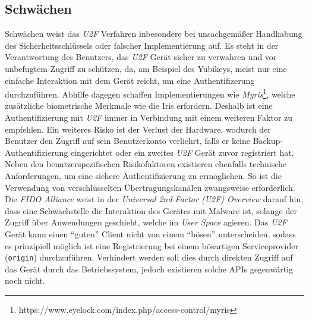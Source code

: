 \documentclass[11pt,a4paper,ngerman]{scrreprt}
\begin{document}
\subsection{Schwächen}
Schwächen weist das \textit{U2F} Verfahren inbesondere bei unsachgemäßer Handhabung des Sicherheitsschlüssels oder falscher Implementierung auf. Es steht in der Verantwortung des Benutzers, das \textit{U2F} Gerät sicher zu verwahren und vor unbefugtem Zugriff zu schützen, da, am Beispiel des Yubikeys, meist nur eine einfache Interaktion mit dem Gerät reicht, um eine Authentifizerung durchzuführen. Abhilfe dagegen schaffen Implementierungen wie \textit{Myris}\footnote{https://www.eyelock.com/index.php/access-control/myris}, welche zusätzliche biometrische Merkmale wie die Iris erfordern. Deshalb ist eine Authentifizierung mit \textit{U2F} immer in Verbindung mit einem weiteren Faktor zu empfehlen. Ein weiteres Risko ist der Verlust der Hardware, wodurch der Benutzer den Zugriff auf sein Benutzerkonto verliehrt, falls er keine Backup-Authentifizierung eingerichtet oder ein zweites \textit{U2F} Gerät zuvor registriert hat. Neben den benutzerspezifischen Risikofaktoren existieren ebenfalls technische Anforderungen, um eine sichere Authentifizierung zu ermöglichen. So ist die Verwendung von verschlüsselten Übertragungskanälen zwangsweise erforderlich. Die \textit{FIDO Alliance} weist in der \textit{Universal 2nd Factor (U2F) Overview} \cite{u2fSpec} darauf hin, dass eine Schwachstelle die Interaktion des Gerätes mit Malware ist, solange der Zugriff über Anwendungen geschieht, welche im \textit{User Space} agieren. Das \textit{U2F} Gerät kann einen ``guten'' Client nicht von einem ``bösen'' unterscheiden, sodass es prinzipiell möglich ist eine Registrierung bei einem bösartigen Serviceprovider (\texttt{origin}) durchzuführen. Verhindert werden soll dies durch direkten Zugriff auf das Gerät durch das Betriebssystem, jedoch existieren solche APIs gegenwärtig noch nicht.
\end{document}
